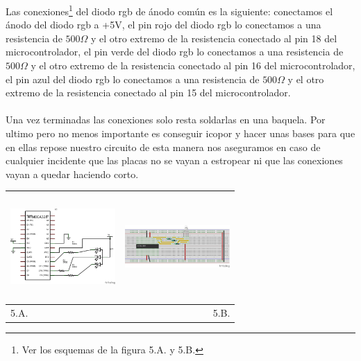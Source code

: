 \documentclass[12]{article}
\newenvironment{Figure}
{\par\medskip\noindent\minipage{\linewidth}}
{\endminipage\par\medskip}
\begin{document}
\begin{multicols}{2}
Las conexiones\footnote{Ver los esquemas de la figura 5.A. y 5.B.} del diodo rgb de ánodo común es la siguiente: conectamos el ánodo del diodo rgb a +5V, el pin rojo del diodo rgb lo conectamos a una resistencia de $500\Omega$ y el otro extremo de la resistencia conectado al pin 18 del microcontrolador, el pin verde del diodo rgb lo conectamos a una resistencia de $500\Omega$ y el otro extremo de la resistencia conectado al pin 16 del microcontrolador, el pin azul del diodo rgb lo conectamos a una resistencia de $500\Omega$ y el otro extremo de la resistencia conectado al pin 15 del microcontrolador.\\\\
Una vez terminadas las conexiones solo resta soldarlas en una baquela. Por ultimo pero no menos importante es conseguir icopor y hacer unas bases para que en ellas repose nuestro circuito de esta manera nos aseguramos en caso de cualquier incidente que las placas no se vayan a estropear ni que las conexiones vayan a quedar haciendo corto.
\begin{Figure}	
\center
\begin{tabular}{|l|r|}
\hline
\includegraphics[width=4cm, height=4cm]{img/rgbesq.png} & \includegraphics[width=4cm, height=4cm]{img/rgbmont.png} \\ \hline
5.A. & 5.B. \\ \hline
\end{tabular}
\label{fig:g5}
\end{Figure}
\vspace{0.6 cm}


\end{multicols}
\end{document}
